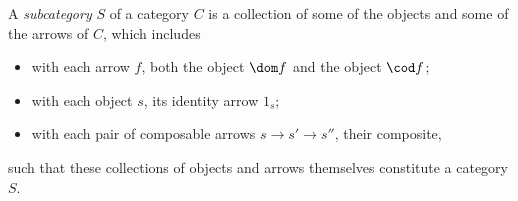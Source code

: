 A \emph{subcategory} $S$ of a category $C$ is a collection of some of the objects and some of the arrows of $C$, which includes
\begin{itemize}
\item with each arrow $f$, both the object $\dom f$ and the object $\cod f$;
\item with each object $s$, its identity arrow $1_s$;
\item with each pair of composable arrows $s \rightarrow s' \rightarrow s''$, their composite,
\end{itemize}
such that these collections of objects and arrows themselves constitute a category $S$.

